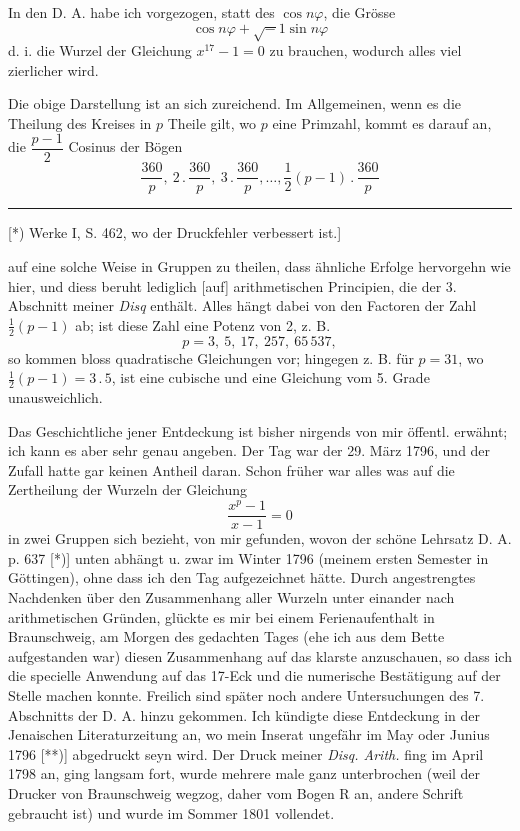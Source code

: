 In den D. A. habe ich vorgezogen, statt des $\cos n\varphi$, die Grösse
\[\cos n\varphi+\surd-1\sin n\varphi\]
\noindent d. i. die Wurzel der Gleichung $x^{17}-1=0$ zu brauchen, wodurch alles viel
zierlicher wird.

Die obige Darstellung ist an sich zureichend. Im Allgemeinen, wenn es die Theilung des
Kreises in $p$ Theile gilt, wo $p$ eine Primzahl, kommt es darauf an, die
$\dfrac{p-1}{2}$ Cosinus der Bögen
\[\frac{360}p,\ 2\mathpunct{.}\frac{360}p,\ 3\mathpunct{.}\frac{360}p,\ldots,
\frac12(p-1)\mathpunct{.}\frac{360}p\]
\par\smallskip\noindent\rule{.25\linewidth}{.4pt}\par\smallskip
{\small\noindent\hspace*{\parindent}[*) Werke I, S. 462, wo der Druckfehler verbessert ist.]\par}
\clearpage
{}
\noindent auf eine solche Weise in Gruppen zu theilen, dass ähnliche Erfolge hervorgehn wie hier,
und diess beruht lediglich [auf] arithmetischen Principien, die der 3. Abschnitt meiner
\textit{Disq} enthält. Alles hängt dabei von den Factoren der Zahl $\tfrac12(p-1)$ ab;
ist diese Zahl eine Potenz von 2, z. B.
\[p=3,\ 5,\ 17,\ 257,\ 65\,537,\]
\noindent so kommen bloss quadratische Gleichungen vor; hingegen z. B. für $p=31$, wo
$\tfrac12(p-1)=3\mathpunct{.}5$, ist eine cubische und eine Gleichung vom 5. Grade unausweichlich.

Das Geschichtliche jener Entdeckung ist bisher nirgends von mir öffentl. erwähnt;
ich kann es aber sehr genau angeben. Der Tag war der 29. März 1796, und der Zufall hatte
gar keinen Antheil daran. Schon früher war alles was auf die Zertheilung der Wurzeln der Gleichung
\[\frac{x^p-1}{x-1}=0\]
\noindent in zwei Gruppen sich bezieht, von mir gefunden, wovon der schöne Lehrsatz D. A. p. 637 [*)]
unten abhängt u. zwar im Winter 1796 (meinem ersten Semester in Göttingen), ohne dass ich den Tag
aufgezeichnet hätte. Durch angestrengtes Nachdenken über den Zusammenhang aller Wurzeln unter
einander nach arithmetischen Gründen, glückte es mir bei einem Ferienaufenthalt in Braunschweig,
am Morgen des gedachten Tages (ehe ich aus dem Bette aufgestanden war) diesen Zusammenhang auf
das klarste anzuschauen, so dass ich die specielle Anwendung auf das 17-Eck und die numerische
Bestätigung auf der Stelle machen konnte. Freilich sind später noch andere Untersuchungen des
7. Abschnitts der D. A. hinzu gekommen. Ich kündigte diese Entdeckung in der Jenaischen
Literaturzeitung an, wo mein Inserat ungefähr im May oder Junius 1796 [**)] abgedruckt seyn wird.
Der Druck meiner \textit{Disq. Arith.} fing im April 1798 an, ging langsam fort, wurde mehrere male
ganz unterbrochen (weil der Drucker von Braunschweig wegzog, daher vom Bogen R an, andere Schrift
gebraucht ist) und wurde im Sommer 1801 vollendet.

